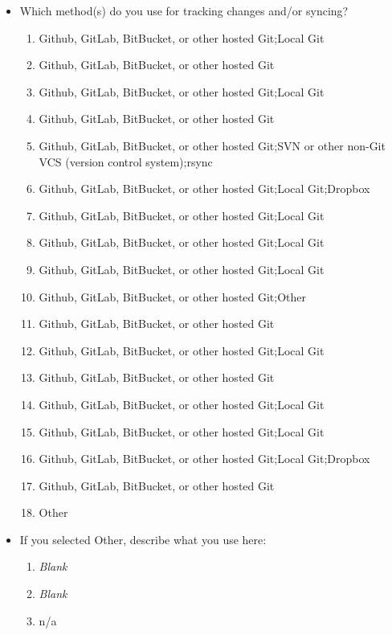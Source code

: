\documentclass[letterpaper]{jdf}
\begin{document}
\begin{itemize}
\begin{enumerate}
    \end{enumerate}
    \item Which method(s) do you use for tracking changes and/or syncing?
    \begin{enumerate}
        \item Github, GitLab, BitBucket, or other hosted Git;Local Git
        \item Github, GitLab, BitBucket, or other hosted Git
        \item Github, GitLab, BitBucket, or other hosted Git;Local Git
        \item Github, GitLab, BitBucket, or other hosted Git
        \item Github, GitLab, BitBucket, or other hosted Git;SVN or other non-Git VCS (version control system);rsync
        \item Github, GitLab, BitBucket, or other hosted Git;Local Git;Dropbox
        \item Github, GitLab, BitBucket, or other hosted Git;Local Git
        \item Github, GitLab, BitBucket, or other hosted Git;Local Git
        \item Github, GitLab, BitBucket, or other hosted Git;Local Git
        \item Github, GitLab, BitBucket, or other hosted Git;Other
        \item Github, GitLab, BitBucket, or other hosted Git
        \item Github, GitLab, BitBucket, or other hosted Git;Local Git
        \item Github, GitLab, BitBucket, or other hosted Git
        \item Github, GitLab, BitBucket, or other hosted Git;Local Git
        \item Github, GitLab, BitBucket, or other hosted Git;Local Git
        \item Github, GitLab, BitBucket, or other hosted Git;Local Git;Dropbox
        \item Github, GitLab, BitBucket, or other hosted Git
        \item Other
    \end{enumerate}
    \item If you selected Other, describe what you use here:
    \begin{enumerate}
        \item \emph{Blank}
        \item \emph{Blank}
        \item n/a

\end{enumerate}
\end{itemize}
\end{document}
